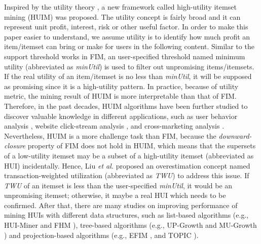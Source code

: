 \documentclass[journal]{IEEEtran}
\begin{document}
Inspired by the utility theory \cite{Hutchison1963}, a new framework called high-utility itemset mining (HUIM) \cite{gan2021survey} was proposed. The utility concept is fairly broad and it can represent unit profit, interest, risk or other useful factor. In order to make this paper easier to understand, we assume utility is to identify how much profit an item/itemset can bring or make for users in the following content. Similar to the support threshold works in FIM, an user-specified threshold named minimum utility (abbreviated as \textit{minUtil}) is used to filter out unpromising items/itemsets. If the real utility of an item/itemset is no less than \textit{minUtil}, it will be supposed as promising since it is a high-utility pattern. In practice, because of utility metric, the mining result of HUIM is more interpretable than that of FIM. Therefore, in the past decades, HUIM algorithms have been further studied to discover valuable knowledge in different applications, such as user behavior analysis \cite{shie2013mining}, website click-stream analysis \cite{chu2008efficient}, and cross-marketing analysis \cite{yen2007mining}. Nevertheless, HUIM is a more challenge task than FIM, because the \textit{downward-closure} property \cite{agrawal1994fast} of FIM does not hold in HUIM, which means that the supersets of a low-utility itemset may be a subset of a high-utility itemset (abbreviated as HUI) incidentally. Hence, Liu \textit{et al.} \cite{liu2005two} proposed an overestimation concept named transaction-weighted utilization (abbreviated as \textit{TWU}) to address this issue. If \textit{TWU} of an itemset is less than the user-specified \textit{minUtil}, it would be an unpromising itemset; otherwise, it maybe a real HUI which needs to be confirmed. After that, there are many studies on improving performance of mining HUIs with different data structures, such as list-based algorithms (e.g., HUI-Miner \cite{liu2012mining} and FHM \cite{fournier2014fhm}), tree-based algorithms (e.g., UP-Growth \cite{tseng2012efficient} and MU-Growth \cite{yun2014high}) and projection-based algorithms (e.g., EFIM \cite{zida2017efim}, and TOPIC \cite{chen2021topic}).
\end{document}

